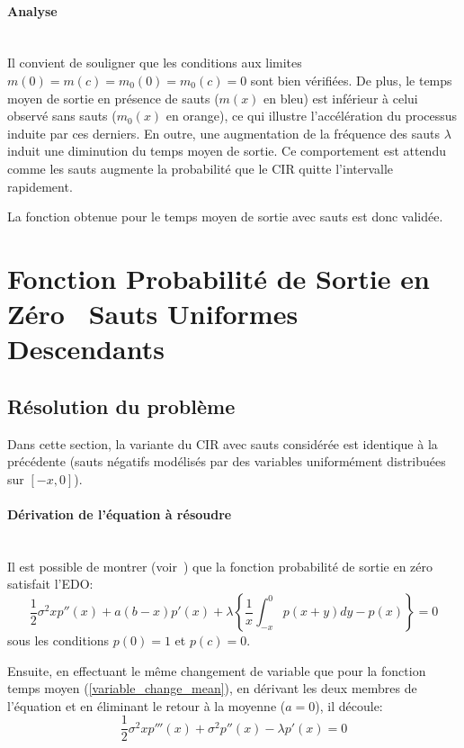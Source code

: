 \FloatBarrier\paragraph{Analyse}\phantom{}\\
Il convient de souligner que les conditions aux limites \( m(0) = m(c) = m_0(0) = m_0(c) = 0 \) sont bien vérifiées. De plus, le temps moyen de sortie en présence de sauts ($m(x)$ en bleu) est inférieur à celui observé sans sauts ($m_0(x)$ en orange), ce qui illustre l'accélération du processus induite par ces derniers. En outre, une augmentation de la fréquence des sauts $\lambda$ induit une diminution du temps moyen de sortie. Ce comportement est attendu comme les sauts augmente la probabilité que le \acs{CIR} quitte l'intervalle rapidement.

La fonction obtenue pour le temps moyen de sortie avec sauts est donc validée.

\section{Fonction Probabilité de Sortie en Zéro \textemdash~Sauts Uniformes Descendants}\label{subsection_probability_jumps}
\subsection{Résolution du problème}
Dans cette section, la variante du \ac{CIR} avec sauts considérée est identique à la précédente (sauts négatifs modélisés par des variables uniformément distribuées sur $[-x,0]$).

\paragraph{Dérivation de l'équation à résoudre}\phantom{}\\
Il est possible de montrer (voir~\cite{lefebvre2007}) que la fonction probabilité de sortie en zéro satisfait l'\acs{EDO}:
\begin{equation}\label{probability_ide}
    \frac{1}{2}\sigma^2xp''(x)+a(b-x)p'(x)+\lambda\left\{\frac{1}{x}\int_{-x}^0p(x+y)dy-p(x)\right\}=0
\end{equation}
sous les conditions $p(0)=1$ et $p(c)=0$.

Ensuite, en effectuant le même changement de variable que pour la fonction temps moyen (\ref{variable_change_mean}), en dérivant les deux membres de l'équation et en éliminant le retour à la moyenne ($a=0$), il découle:
\begin{equation}\label{probability_3rd_order}
    \frac{1}{2}\sigma^2xp'''(x)+\sigma^2p''(x)-\lambda p'(x)=0
\end{equation}
